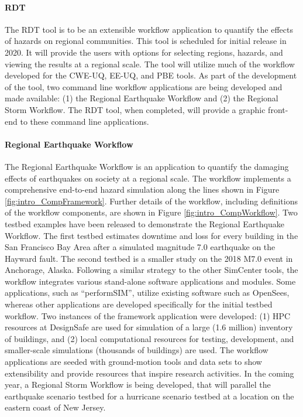 \paragraph{RDT} The RDT tool is to be an extensible workflow application to quantify the effects of hazards on regional communities. This tool is scheduled for initial release in 2020. It will provide the users with options for selecting regions, hazards, and viewing the results at a regional scale. The tool will utilize much of the workflow developed for the CWE-UQ, EE-UQ, and PBE tools. As part of the development of the tool, two command line workflow applications are being developed and made available: (1) the Regional Earthquake Workflow and (2) the Regional Storm Workflow. The RDT tool, when completed, will provide a graphic front-end to these command line applications.

\paragraph{Regional Earthquake Workflow} The Regional Earthquake Workflow is an application to quantify the damaging effects of earthquakes on society at a regional scale. The workflow implements a comprehensive end-to-end hazard simulation along the lines shown in Figure \ref{fig:intro_CompFramework}. Further details of the workflow, including definitions of the workflow components, are shown in Figure \ref{fig:intro_CompWorkflow}. Two testbed examples have been released to demonstrate the Regional Earthquake Workflow. The first testbed estimates downtime and loss for every building in the San Francisco Bay Area after a simulated magnitude 7.0 earthquake on the Hayward fault. The second testbed is a smaller study on the 2018 M7.0 event in Anchorage, Alaska. Following a similar strategy to the other SimCenter tools, the workflow integrates various stand-alone software applications and modules. Some applications, such as “performSIM”, utilize existing software such as OpenSees, whereas other applications are developed specifically for the initial testbed workflow. Two instances of the framework application were developed: (1) HPC resources at DesignSafe are used for simulation of a large (1.6 million) inventory of buildings, and (2) local computational resources for testing, development, and smaller-scale simulations (thousands of buildings) are used. The workflow applications are seeded with ground-motion tools and data sets to show extensibility and provide resources that inspire research activities. In the coming year, a Regional Storm Workflow is being developed, that will parallel the earthquake scenario testbed for a hurricane scenario testbed at a location on the eastern coast of New Jersey.

